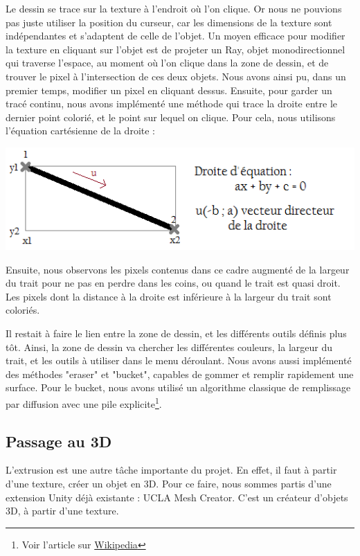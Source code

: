 \documentclass[a4paper,11pt]{article}
\begin{document}
			Le dessin se trace sur la texture à l'endroit où l'on clique. Or nous ne pouvions pas juste utiliser la position du curseur, car les dimensions de la texture sont indépendantes et s'adaptent de celle de l'objet. Un moyen efficace pour modifier la texture en cliquant sur l'objet est de projeter un Ray, objet monodirectionnel qui traverse l'espace, au moment où l'on clique dans la zone de dessin, et de trouver le pixel à l'intersection de ces deux objets. Nous avons ainsi pu, dans un premier temps, modifier un pixel en cliquant dessus. Ensuite, pour garder un tracé continu, nous avons implémenté une méthode qui trace la droite entre le dernier point colorié, et le point sur lequel on clique. Pour cela, nous utilisons l'équation cartésienne de la droite :
			\centerline{\includegraphics[scale=0.6]{images/trait.png}}
			Ensuite, nous observons les pixels contenus dans ce cadre augmenté de la largeur du trait pour ne pas en perdre dans les coins, ou quand le trait est quasi droit. Les pixels dont la distance à la droite est inférieure à la largeur du trait sont coloriés.
			
			 Il restait à faire le lien entre la zone de dessin, et les différents outils définis plus tôt. Ainsi, la zone de dessin va chercher les différentes couleurs, la largeur du trait, et les outils à utiliser dans le menu déroulant. Nous avons aussi implémenté des méthodes "eraser" et "bucket", capables de gommer et remplir rapidement une surface. Pour le bucket, nous avons utilisé un algorithme classique de remplissage par diffusion avec une pile explicite\footnote{Voir l'article sur \href{http://fr.wikipedia.org/wiki/Algorithme_de_remplissage_par_diffusion}{Wikipedia}}.
			
		\hypertarget{ancre}{
		\subsection{Passage au 3D}}
		\label{extrusion}
			L'extrusion est une autre tâche importante du projet. En effet, il faut à partir d'une texture, créer un objet en 3D. Pour ce faire, nous sommes partis d'une extension Unity déjà existante : UCLA Mesh Creator. C'est un créateur d'objets 3D, à partir d'une texture.
			
\end{document}
